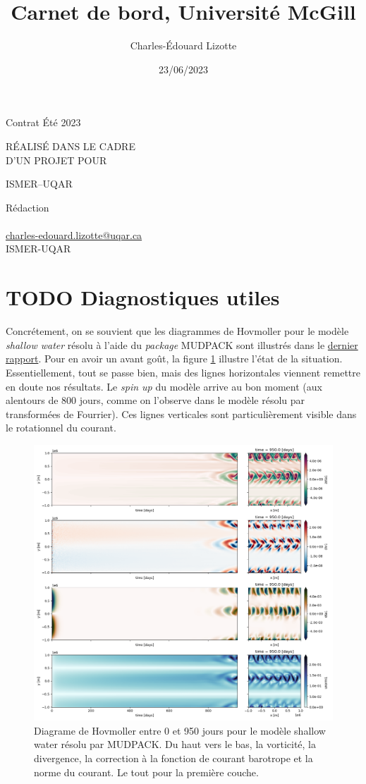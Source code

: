 \documentclass[10pt]{article}
\author{Charles-Édouard Lizotte}
\date{23/06/2023}
\title{Carnet de bord, Université McGill}
\makeatletter
\numberwithin{equation}{section}
\newcommand{\mytitlepage}{
\begin{titlepage}
\begin{center}
{\Large Contrat Été 2023 \par}
\vspace{2cm}
{\Large \MakeUppercase{\thetitle} \par}
\vspace{2cm}
RÉALISÉ DANS LE CADRE\\ D'UN PROJET POUR \par
\vspace{2cm}
{\Large ISMER--UQAR \par}
\vspace{2cm}
{\thedate}
\end{center}
\vfill
Rédaction \\
{\theauthor}\\
\url{charles-edouard.lizotte@uqar.ca}\\
ISMER-UQAR
\end{titlepage}
}
\makeatother
\begin{document}
\mytitlepage
\tableofcontents\newpage



\section{{\bfseries\sffamily TODO} Diagnostiques utiles}
\label{sec:orgb5e89cc}

Concrétement, on se souvient que les diagrammes de Hovmoller pour le modèle \emph{shallow water} résolu à l'aide du \emph{package} MUDPACK sont illustrés dans le \href{rapport-2023-06-16.org}{dernier rapport}.
Pour en avoir un avant goût, la figure \ref{fig:org763f1d1} illustre l'état de la situation.
Essentiellement, tout se passe bien, mais des lignes horizontales viennent remettre en doute nos résultats.
Le \emph{spin up} du modèle arrive au bon moment (aux alentours de 800 jours, comme on l'observe dans le modèle résolu par transformées de Fourrier).
Ces lignes verticales sont particulièrement visible dans le rotationnel du courant. 

\begin{figure}[htbp]
\centering
\includegraphics[width=.9\linewidth]{figures/tests/2023-06-21_hovmoller1_t=950days.png}
\caption{\label{fig:org763f1d1}Diagrame de Hovmoller entre 0 et 950 jours pour le modèle shallow water résolu par MUDPACK. Du haut vers le bas, la vorticité, la divergence, la correction à la fonction de courant barotrope et la norme du courant. Le tout pour la première couche.}
\end{figure}
\end{document}
